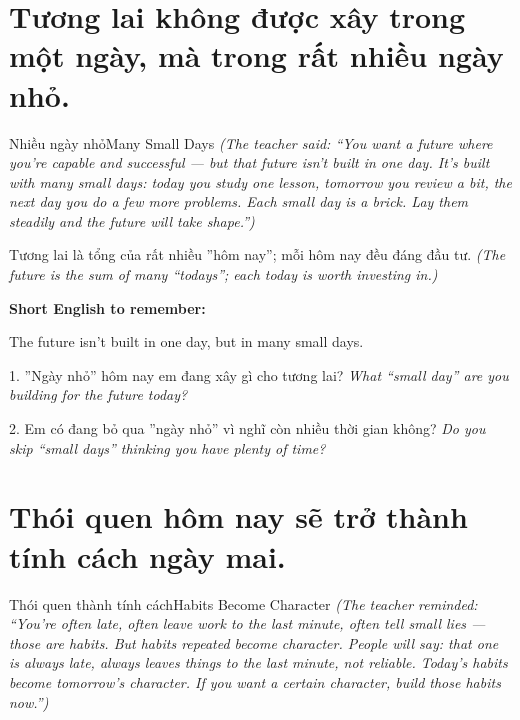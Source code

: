 \section{Tương lai không được xây trong một ngày, mà trong rất nhiều ngày nhỏ.}
\begin{truyen}{Nhiều ngày nhỏ}{Many Small Days}
\textit{(The teacher said: ``You want a future where you're capable and successful — but that future isn't built in one day. It's built with many small days: today you study one lesson, tomorrow you review a bit, the next day you do a few more problems. Each small day is a brick. Lay them steadily and the future will take shape.'')}
\end{truyen}

\begin{baihoc}
Tương lai là tổng của rất nhiều ''hôm nay''; mỗi hôm nay đều đáng đầu tư.
\textit{(The future is the sum of many ``todays''; each today is worth investing in.)}
\end{baihoc}

\begin{ghinhoanh}
\textbf{Short English to remember:}

The future isn't built in one day, but in many small days.

\end{ghinhoanh}

\begin{tuhocnhanh}
1. ''Ngày nhỏ'' hôm nay em đang xây gì cho tương lai? \textit{What ``small day'' are you building for the future today?}

2. Em có đang bỏ qua ''ngày nhỏ'' vì nghĩ còn nhiều thời gian không? \textit{Do you skip ``small days'' thinking you have plenty of time?}
\end{tuhocnhanh}
\ngancach

\section{Thói quen hôm nay sẽ trở thành tính cách ngày mai.}
\begin{truyen}{Thói quen thành tính cách}{Habits Become Character}
\textit{(The teacher reminded: ``You're often late, often leave work to the last minute, often tell small lies — those are habits. But habits repeated become character. People will say: that one is always late, always leaves things to the last minute, not reliable. Today's habits become tomorrow's character. If you want a certain character, build those habits now.'')}
\end{truyen}

